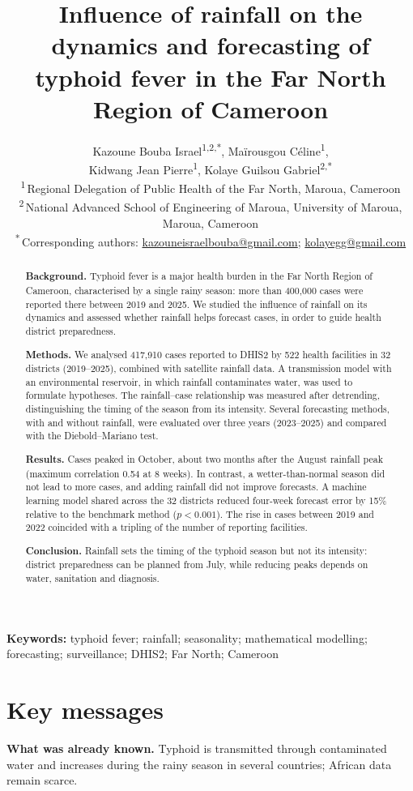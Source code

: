 \documentclass[11pt]{article}
\title{Influence of rainfall on the dynamics and forecasting of typhoid fever in the Far North Region of Cameroon}
\author{Kazoune Bouba Israel\textsuperscript{1,2,*}, Maïrousgou Céline\textsuperscript{1},\\ Kidwang Jean Pierre\textsuperscript{1}, Kolaye Guilsou Gabriel\textsuperscript{2,*}\\[1.2ex]
\small \textsuperscript{1}\,Regional Delegation of Public Health of the Far North, Maroua, Cameroon\\
\small \textsuperscript{2}\,National Advanced School of Engineering of Maroua, University of Maroua, Maroua, Cameroon\\
\small \textsuperscript{*}\,Corresponding authors: \href{mailto:kazouneisraelbouba@gmail.com}{kazouneisraelbouba@gmail.com}; \href{mailto:kolayegg@gmail.com}{kolayegg@gmail.com}}
\date{}
\begin{document}
\sloppy
\maketitle
\begin{abstract}
\textbf{Background.} Typhoid fever is a major health burden in the Far North Region of Cameroon, characterised by a single rainy season: more than 400,000 cases were reported there between 2019 and 2025. We studied the influence of rainfall on its dynamics and assessed whether rainfall helps forecast cases, in order to guide health district preparedness.


\textbf{Methods.} We analysed 417,910 cases reported to DHIS2 by 522 health facilities in 32 districts (2019–2025), combined with satellite rainfall data. A transmission model with an environmental reservoir, in which rainfall contaminates water, was used to formulate hypotheses. The rainfall–case relationship was measured after detrending, distinguishing the timing of the season from its intensity. Several forecasting methods, with and without rainfall, were evaluated over three years (2023–2025) and compared with the Diebold–Mariano test.


\textbf{Results.} Cases peaked in October, about two months after the August rainfall peak (maximum correlation 0.54 at 8 weeks). In contrast, a wetter-than-normal season did not lead to more cases, and adding rainfall did not improve forecasts. A machine learning model shared across the 32 districts reduced four-week forecast error by 15\% relative to the benchmark method ($p<0.001$). The rise in cases between 2019 and 2022 coincided with a tripling of the number of reporting facilities.


\textbf{Conclusion.} Rainfall sets the timing of the typhoid season but not its intensity: district preparedness can be planned from July, while reducing peaks depends on water, sanitation and diagnosis.


\end{abstract}

\noindent \textbf{Keywords:} typhoid fever; rainfall; seasonality; mathematical modelling; forecasting; surveillance; DHIS2; Far North; Cameroon

\section*{Key messages}
\textbf{What was already known.} Typhoid is transmitted through contaminated water and increases during the rainy season in several countries; African data remain scarce.
\end{document}
